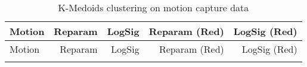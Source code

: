 \begin{longtable}{lrrrr}
    \caption{K-Medoids clustering on motion capture data} \label{tab:k-medoids-motion-capture} \\
    \toprule
    Motion & Reparam & LogSig & Reparam (Red) & LogSig (Red) \\
    \midrule
    \endfirsthead
    
    \toprule
    Motion & Reparam & LogSig & Reparam (Red) & LogSig (Red) \\
    \midrule
    \endhead
    
    \bottomrule
    \endfoot
    
    \bottomrule
    \endlastfoot
    
    
\end{longtable}

